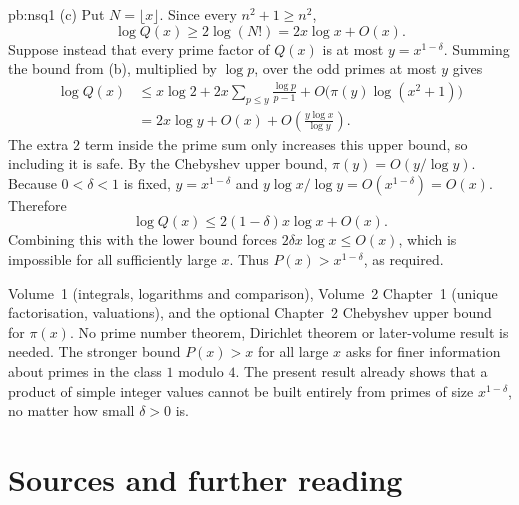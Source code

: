 \begin{solution}{pb:nsq1}
(c) Put $N=\lfloor x\rfloor$.
Since every $n^2+1\ge n^2$,
\[
\log Q(x)\ge2\log(N!)
=2x\log x+O(x).
\]
Suppose instead that every prime factor of
$Q(x)$ is at most $y=x^{1-\delta}$.
Summing the bound from (b), multiplied
by $\log p$, over the odd primes at most $y$ gives
\[
\begin{aligned}
\log Q(x)
&\le x\log2
+2x\sum_{p\le y}\frac{\log p}{p-1}
+O\bigl(\pi(y)\log(x^2+1)\bigr)\\
&=2x\log y+O(x)
+O\left(\frac{y\log x}{\log y}\right).
\end{aligned}
\]
The extra $2$ term inside the prime sum only
increases this upper bound, so including it is safe.
By the Chebyshev upper bound,
$\pi(y)=O(y/\log y)$.
Because $0<\delta<1$ is fixed,
$y=x^{1-\delta}$ and
$y\log x/\log y=O(x^{1-\delta})=O(x)$.
Therefore
\[
\log Q(x)\le2(1-\delta)x\log x+O(x).
\]
Combining this with the lower bound forces
$2\delta x\log x\le O(x)$,
which is impossible for all sufficiently large $x$.
Thus $P(x)>x^{1-\delta}$, as required.

\tools Volume~1 (integrals, logarithms and comparison),
Volume~2 Chapter~1 (unique factorisation, valuations),
and the optional Chapter~2 Chebyshev upper bound
for $\pi(x)$. No prime number theorem, Dirichlet
theorem or later-volume result is needed.
\leads The stronger bound $P(x)>x$ for all large $x$
asks for finer information about primes in the
class $1$ modulo $4$. The present result already
shows that a product of simple integer values
cannot be built entirely from primes of size
$x^{1-\delta}$, no matter how small $\delta>0$ is.
\end{solution}

\section*{Sources and further reading}

